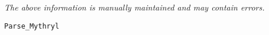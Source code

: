 \label{pkg:parse\_mythryl}

{\tiny \it The above information is manually maintained and may contain errors.}
\begin{verbatim}
Parse_Mythryl
\end{verbatim}
